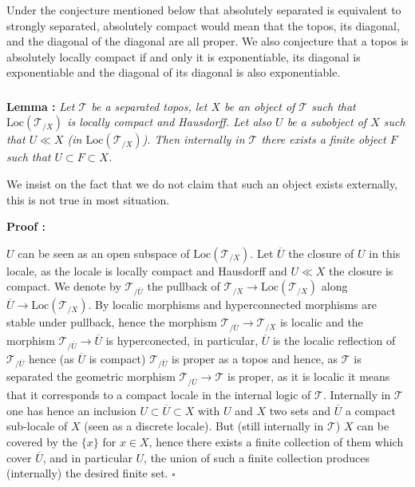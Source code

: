 \documentclass[a4paper]{article}
\newcommand{\loc}{\text{Loc}}
\newcommand{\Tcal}{\mathcal{T}}
\newcommand{\block}[1]
{

\par \subsubsection{} #1

\bigskip}
\newcommand{\Lem}[1]
	{

	\bigskip
	
	\textbf{Lemma : }{\itshape #1}
		
	\bigskip
	
	}
\newcommand{\Dem}[1]{
	
	\smallskip
	
	\textbf{Proof : } \par
	 {#1} $\square$
	 
	 \bigskip
}
\begin{document}
\block{Under the conjecture mentioned below that absolutely separated is equivalent to strongly separated, absolutely compact would mean that the topos, its diagonal, and the diagonal of the diagonal are all proper. We also conjecture that a topos is absolutely locally compact if and only it is exponentiable, its diagonal is exponentiable and the diagonal of its diagonal is also exponentiable.}


\block{\label{Lem_ll_ext_int}\Lem{Let $\Tcal$ be a separated topos, let $X$ be an object of $\Tcal$ such that $\loc(\Tcal_{/X})$ is locally compact and Hausdorff. Let also $U$ be a subobject of $X$ such that $U \ll X$ (in $\loc(\Tcal_{/X})$). Then internally in $\Tcal$ there exists a finite object $F$ such that $U \subset F \subset X$. }

We insist on the fact that we do not claim that such an object exists externally, this is not true in most situation.


\Dem{$U$ can be seen as an open subspace of $\loc(\Tcal_{/X})$. Let $\overline{U}$ the closure of $U$ in this locale, as the locale is locally compact and Hausdorff and $U \ll X$ the closure is compact. We denote by $\Tcal_{/\overline{U}}$ the pullback of $\Tcal_{/X} \rightarrow \loc(\Tcal_{/X})$ along $\overline{U} \rightarrow \loc(\Tcal_{/X})$. By \cite[C2.4.12]{sketches} localic morphisms and hyperconnected morphisms are stable under pullback, hence the morphism $\Tcal_{/\overline{U}} \rightarrow \Tcal_{/X}$ is localic and the morphism $\Tcal_{/\overline{U}} \rightarrow \overline{U}$ is hyperconected, in particular, $\overline{U}$ is the localic reflection of $\Tcal_{/\overline{U}}$ hence (as $\overline{U}$ is compact) $\Tcal_{/\overline{U}}$ is proper as a topos and hence, as $\Tcal$ is separated the geometric morphism $\Tcal_{/\overline{U}} \rightarrow \Tcal$ is proper, as it is localic it means that it corresponds to a compact locale in the internal logic of $\Tcal$. Internally in $\Tcal$ one has hence an inclusion $U \subset \overline{U} \subset X$ with $U$ and $X$ two sets and $\overline{U}$ a compact sub-locale of $X$ (seen as a discrete locale). But (still internally in $\Tcal$) $X$ can be covered by the $\{ x \}$ for $x \in X$, hence there exists a finite collection of them which cover $\overline{U}$, and in particular $U$, the union of such a finite collection produces (internally) the desired finite set. }}
\end{document}
